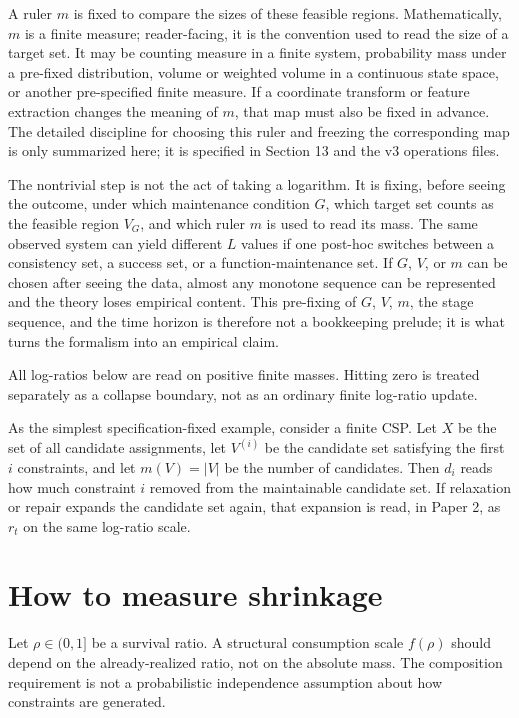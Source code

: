\documentclass[12pt,a4paper]{article}
\begin{document}
A ruler \(m\) is fixed to compare the sizes of these feasible regions. Mathematically, \(m\) is a finite measure; reader-facing, it is the convention used to read the size of a target set. It may be counting measure in a finite system, probability mass under a pre-fixed distribution, volume or weighted volume in a continuous state space, or another pre-specified finite measure. If a coordinate transform or feature extraction changes the meaning of \(m\), that map must also be fixed in advance. The detailed discipline for choosing this ruler and freezing the corresponding map is only summarized here; it is specified in Section 13 and the v3 operations files.

The nontrivial step is not the act of taking a logarithm. It is fixing, before seeing the outcome, under which maintenance condition \(G\), which target set counts as the feasible region \(V_{G}\), and which ruler \(m\) is used to read its mass. The same observed system can yield different \(L\) values if one post-hoc switches between a consistency set, a success set, or a function-maintenance set. If \(G\), \(V\), or \(m\) can be chosen after seeing the data, almost any monotone sequence can be represented and the theory loses empirical content. This pre-fixing of \(G\), \(V\), \(m\), the stage sequence, and the time horizon is therefore not a bookkeeping prelude; it is what turns the formalism into an empirical claim.

All log-ratios below are read on positive finite masses. Hitting zero is treated separately as a collapse boundary, not as an ordinary finite log-ratio update.

As the simplest specification-fixed example, consider a finite CSP. Let \(X\) be the set of all candidate assignments, let \(V^{(i)}\) be the candidate set satisfying the first \(i\) constraints, and let \(m(V)=|V|\) be the number of candidates. Then \(d_{i}\) reads how much constraint \(i\) removed from the maintainable candidate set. If relaxation or repair expands the candidate set again, that expansion is read, in Paper 2, as \(r_{t}\) on the same log-ratio scale.

\section{How to measure shrinkage}\label{how-to-measure-shrinkage}

Let \(\rho\in(0,1]\) be a survival ratio. A structural consumption scale \(f(\rho)\) should depend on the already-realized ratio, not on the absolute mass. The composition requirement is not a probabilistic independence assumption about how constraints are generated.
\end{document}
